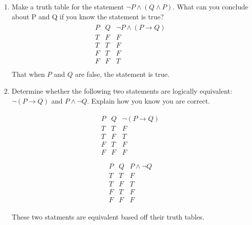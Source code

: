 \documentclass[11pt,a4paper]{article}
\newcommand\setItemNumber[1]{\setcounter{enumi}{\numexpr#1-1\relax}}
\begin{document}
\begin{enumerate}
        \setItemNumber{3}
        \item Make a truth table for the statement $\neg P\land(Q\land P)$. What can you conclude about P and Q if you know the statement is true?
        \begin{align*}
            \begin{array}{|c|c|c|}
                P & Q & \neg P\land (P\rightarrow Q)\\
            \hline
            T & F & F\\
            T & T & F\\
            F & T & F\\
            F & F & T\\
            \end{array}
        \end{align*}
        That when $P$ and $Q$ are false, the statement is true.

        \setItemNumber{6}
    \item Determine whether the following two statements are logically equivalent: $\neg(P\rightarrow Q)$ and $P\land\neg Q$. Explain how you know you are correct.

        \begin{align*}
            \begin{array}{|c|c|c|}
                P & Q & \neg (P\rightarrow Q)\\
            \hline
            T & T & F\\
            T & F & T\\
            F & T & F\\
            F & F & F\\
            \end{array}
        \end{align*}
        \begin{align*}
            \begin{array}{|c|c|c|}
                P & Q & P\land\neg Q\\
            \hline
            T & T & F\\
            T & F & T\\
            F & T & F\\
            F & F & F
            \end{array}
        \end{align*}

        These two statments are equivalent based off their truth tables.


\end{enumerate}
\end{document}
